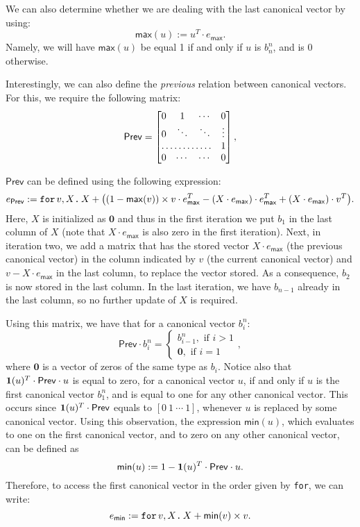 We can also determine whether we are dealing with the last canonical vector by using:
$$
\mathsf{max}(u):=u^T\cdot e_{\mathsf{max}}.
$$
Namely, we will have $\mathsf{max}(u)$ be equal 1 if and only if $u$ is $b_n^n$, and is 0 otherwise.

Interestingly, we can also define the \textit{previous} relation between canonical vectors. 
For this, we require the following matrix:
\[
\mathsf{Prev} = \begin{bmatrix}
    0 & 1 & \cdots &  0 \\
    0 & \ddots & \ddots & \vdots \\
    \hdotsfor{3} & 1 \\
    0 & \cdots & \cdots & 0
\end{bmatrix},
\]

$\mathsf{Prev}$ can be defined using the following \langfor expression:
$$e_{\mathsf{Prev}}:= \texttt{for}\, v,X \texttt{.}\, X + \bigl((1 - \mathsf{max}(v))\times v\cdot e_{\mathsf{max}}^T - (X\cdot e_{\mathsf{max}})\cdot e_{\mathsf{max}}^T + (X\cdot e_{\mathsf{max}})\cdot v^T\bigr).$$
Here, $X$ is initialized as $\mathbf{0}$ and thus in the first iteration we put
 $b_1$ in the last column of $X$ (note that $X\cdot e_{\mathsf{max}}$ is also zero in the first iteration). Next, in iteration two, we add a matrix that has the stored vector $X\cdot e_{\mathsf{max}}$ (the previous canonical vector) in the column indicated by $v$ (the current canonical vector) and $v-X\cdot e_{\mathsf{max}}$ in the last column, to replace the vector stored. As a consequence, $b_2$ is now stored in the last column. In the last iteration, we have $b_{n-1}$ already in the last column, so no further update of $X$ is required.

Using this matrix, we have that for a canonical vector $b_i^n$:
\[
\mathsf{Prev}\cdot b_i^n=\begin{cases}
               b_{i-1}^n, \text{ if } i > 1 \\
              \mathbf{0}, \text{ if } i = 1
            \end{cases},
\]
where $\mathbf{0}$ is a vector of zeros of the same type as $b_i$. Notice also that $\mathbf{1}(u)^T\cdot \mathsf{Prev} \cdot u$ is equal to zero, for a canonical vector $u$, if and only if $u$ is the first canonical vector $b_1^n$, and is equal to one for any other canonical vector. This occurs since $\mathbf{1}(u)^T\cdot \mathsf{Prev}$ equals to $[0\ 1\ \cdots\ 1]$, whenever $u$ is replaced by some canonical vector. Using this observation, the expression $\mathsf{min}(u)$, which evaluates to one on the first canonical vector, and to zero on any other canonical vector, can be  defined as $$\mathsf{min}(u) := 1 - \mathbf{1}(u)^T\cdot \mathsf{Prev} \cdot u.$$%
Therefore, to access the first canonical vector in the order given by \texttt{for}, we can write:
$$e_{\mathsf{min}} := \texttt{for}\, v,X \texttt{.}\, X + \mathsf{min}(v)\times v.$$


